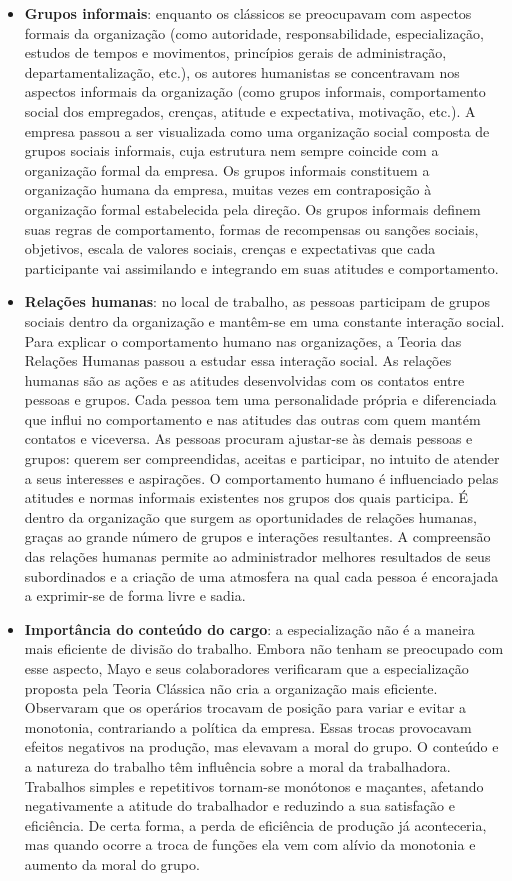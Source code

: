 \begin{itemize}
	\item \textbf{Grupos informais}: enquanto os clássicos se preocupavam com aspectos formais da organização (como autoridade, responsabilidade, especialização, estudos de tempos e movimentos, princípios gerais de administração, departamentalização, etc.), os autores humanistas se concentravam nos aspectos informais da organização (como grupos informais, comportamento social dos empregados, crenças, atitude e expectativa, motivação, etc.). A empresa passou a ser visualizada como uma organização social composta de grupos sociais
	informais, cuja estrutura nem sempre coincide com a organização formal da empresa. Os grupos informais constituem a organização humana da empresa, muitas vezes em contraposição à organização formal estabelecida pela direção. Os grupos informais definem suas regras de 	comportamento, formas de recompensas ou sanções sociais, objetivos, escala de valores sociais, crenças e expectativas que cada participante vai assimilando e integrando em suas atitudes e comportamento.
	
	\item \textbf{Relações humanas}: no local de trabalho, as pessoas participam de grupos sociais dentro da organização e mantêm-se em uma
	constante interação social. Para explicar o comportamento humano nas organizações, a Teoria das	Relações Humanas passou a estudar essa interação social. As relações humanas são as ações e as atitudes desenvolvidas com os contatos entre pessoas e grupos. Cada pessoa tem uma personalidade própria e	diferenciada que influi no comportamento e nas atitudes das outras com quem mantém contatos e viceversa. As pessoas procuram ajustar-se às demais pessoas e grupos: querem ser compreendidas, aceitas e	participar, no intuito de atender a seus interesses e aspirações. O comportamento humano é influenciado pelas atitudes e normas informais existentes nos grupos dos quais participa. É dentro da organização que surgem as oportunidades de relações humanas, graças ao grande número de grupos e interações
	resultantes. A compreensão das relações humanas permite ao administrador melhores resultados de seus subordinados e a criação de uma atmosfera na qual cada pessoa é encorajada a exprimir-se de forma livre	e sadia.
	
	\item \textbf{Importância do conteúdo do cargo}: a especialização não é a maneira mais eficiente de divisão do trabalho. Embora não tenham se preocupado com esse aspecto, Mayo e seus colaboradores verificaram que a especialização proposta pela Teoria	Clássica não cria a organização mais eficiente. Observaram que os operários trocavam de posição para variar e evitar a monotonia, contrariando a política da empresa. Essas trocas provocavam efeitos negativos na produção, mas elevavam a moral do grupo. O conteúdo e a natureza do trabalho têm influência sobre a moral da trabalhadora. Trabalhos simples e repetitivos tornam-se monótonos e maçantes, afetando negativamente a atitude do trabalhador e reduzindo a sua satisfação e eficiência. De certa forma, a perda de eficiência de produção já aconteceria, mas quando ocorre a troca de funções ela vem com alívio da monotonia e aumento da moral do grupo.
	

\end{itemize}
